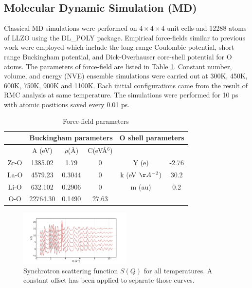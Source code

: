 \documentclass[twoside,twocolumn,9pt]{article}
\begin{document}
\subsection{Molecular Dynamic Simulation (MD)}
Classical MD simulations were performed on $4\times 4\times 4$ unit cells and 12288 atoms of LLZO using the DL\_POLY package.
Empirical force-fields similar to previous work were employed which include the long-range Coulombic potential,
short-range Buckingham potential, and Dick-Overhauser core-shell potential for O atoms.
The parameters of force-field are listed in Table \ref{tab:md_force}.
Constant number, volume, and energy (NVE) ensemble simulations were carried out at 300K, 450K, 600K, 750K, 900K and 1100K.
Each initial configurations came from the result of RMC analysis at same temperature.
The simulations were performed for 10 ps with atomic positions saved every 0.01 ps.



\begin{table}[h]
\centering
\caption{Force-field parameters} \label{tab:md_force}
\begin{tabular}{cccccc}
\hline
      & \multicolumn{3}{c}{Buckingham parameters}    & \multicolumn{2}{c}{O shell parameters}         \\
\hline
      & A (eV)  & $\rho$(\AA) & C(eV\AA$^6$)         &                    &       \\
Zr-O  & 1385.02 & 1.79        & 0                    & Y (e)              &  -2.76\\
La-O  & 4579.23 & 0.3044      & 0                    & k (eV $\AA^{-2}$)  &  30.2 \\
Li-O  & 632.102 & 0.2906      & 0                    & m (au)             &  0.2  \\
O-O   & 22764.30& 0.1490      & 27.63                &                    &       \\
\hline
\end{tabular}
\end{table}


\begin{figure}
\centering
\includegraphics[width=0.5\textwidth]{Pics/xsoq.pdf}
\caption{Synchrotron scattering function $S(Q)$ for all temperatures. A constant offset has been applied to separate those curves.}
\label{fig:xsoq}
\end{figure}
\end{document}
